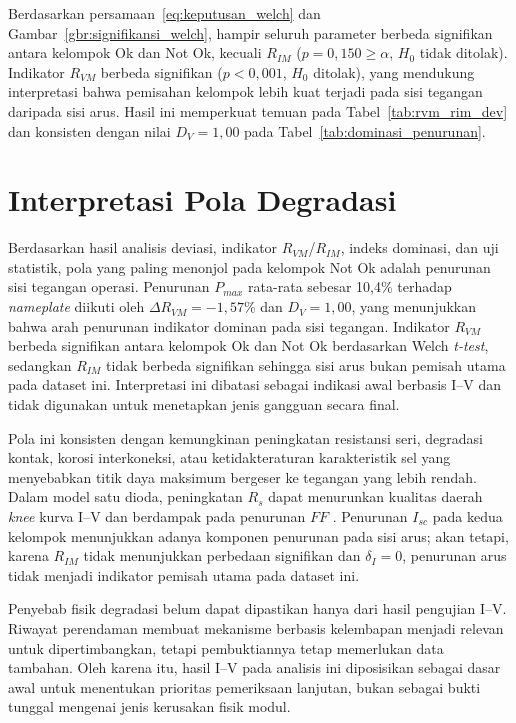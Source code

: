 Berdasarkan persamaan~\eqref{eq:keputusan_welch} dan Gambar~\ref{gbr:signifikansi_welch},
hampir seluruh parameter berbeda signifikan antara kelompok Ok dan Not Ok,
kecuali $R_{IM}$ ($p=0{,}150\geq\alpha$, $H_0$ tidak ditolak). Indikator
$R_{VM}$ berbeda signifikan ($p<0{,}001$, $H_0$ ditolak), yang mendukung
interpretasi bahwa pemisahan kelompok lebih kuat terjadi pada sisi tegangan
daripada sisi arus. Hasil ini memperkuat temuan pada Tabel~\ref{tab:rvm_rim_dev}
dan konsisten dengan nilai $D_V=1{,}00$ pada Tabel~\ref{tab:dominasi_penurunan}.

\section{Interpretasi Pola Degradasi}

Berdasarkan hasil analisis deviasi, indikator $R_{VM}$/$R_{IM}$, indeks
dominasi, dan uji statistik, pola yang paling menonjol pada kelompok Not Ok
adalah penurunan sisi tegangan operasi. Penurunan $P_{max}$ rata-rata sebesar
10,4\% terhadap \textit{nameplate} diikuti oleh $\Delta R_{VM} = -1{,}57\%$
dan $D_V = 1{,}00$, yang menunjukkan bahwa arah penurunan indikator dominan
pada sisi tegangan. Indikator $R_{VM}$ berbeda signifikan antara kelompok Ok
dan Not Ok berdasarkan Welch \textit{t-test}, sedangkan $R_{IM}$ tidak berbeda
signifikan sehingga sisi arus bukan pemisah utama pada dataset ini. Interpretasi
ini dibatasi sebagai indikasi awal berbasis I--V dan tidak digunakan untuk
menetapkan jenis gangguan secara final.

Pola ini konsisten dengan kemungkinan peningkatan resistansi seri, degradasi
kontak, korosi interkoneksi, atau ketidakteraturan karakteristik sel yang
menyebabkan titik daya maksimum bergeser ke tegangan yang lebih rendah. Dalam
model satu dioda, peningkatan $R_s$ dapat menurunkan kualitas daerah
\textit{knee} kurva I--V dan berdampak pada penurunan $FF$
\cite{villalva2009}. Penurunan $I_{sc}$ pada kedua kelompok menunjukkan adanya
komponen penurunan pada sisi arus; akan tetapi, karena $R_{IM}$ tidak
menunjukkan perbedaan signifikan dan $\delta_I = 0$, penurunan arus tidak
menjadi indikator pemisah utama pada dataset ini.

Penyebab fisik degradasi belum dapat dipastikan hanya dari hasil pengujian I--V.
Riwayat perendaman membuat mekanisme berbasis kelembapan menjadi relevan untuk
dipertimbangkan, tetapi pembuktiannya tetap memerlukan data tambahan. Oleh
karena itu, hasil I--V pada analisis ini diposisikan sebagai dasar awal untuk
menentukan prioritas pemeriksaan lanjutan, bukan sebagai bukti tunggal
mengenai jenis kerusakan fisik modul.

